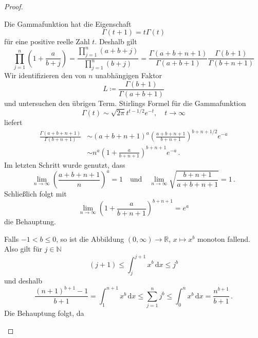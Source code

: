 \documentclass[ngerman,a4paper,11pt]{scrartcl}
\newcommand{\NN}{\mathbb{N}}
\newcommand{\RR}{\mathbb{R}}
\newcommand{\dvar}[1]{\,\mathrm{d}#1}
\begin{document}
\begin{proof}
  \begin{thmlist}
  \item
Die Gammafunktion hat die Eigenschaft 
\begin{equation*}
 \Gamma(t+1)=t\Gamma(t)
\end{equation*}
für eine positive reelle Zahl $t$. Deshalb gilt
\begin{equation*}
  \prod_{j=1}^n\left( 1+\frac{a}{b+j} \right) =\frac{\prod_{j=1}^n(a+b+j)}{\prod_{j=1}^n(b+j)}=
\frac{\Gamma(a+b+n+1)}{\Gamma(a+b+1)}\frac{\Gamma(b+1)}{\Gamma(b+n+1)} 
\end{equation*}
Wir identifizieren den von $n$ unabhängigen Faktor
\begin{equation*}
 L\coloneqq\frac{\Gamma(b+1)}{\Gamma(a+b+1)}
\end{equation*}
und untersuchen den übrigen Term. Stirlings Formel für die Gammafunktion
\begin{equation*}
 \Gamma(t)\sim\sqrt{2\pi} t^{t-1/2}e^{-t},\quad t\to\infty
\end{equation*}
liefert
\begin{align*}
 \frac{\Gamma(a+b+n+1)}{\Gamma(b+n+1)}&\sim (a+b+n+1)^a\left( \frac{a+b+n+1}{b+n+1} \right)^{b+n+1/2}e^{-a} \\
&\sim n^a\left( 1+\frac{a}{b+n+1} \right)^{b+n+1}e^{-a}\,. %
\end{align*}
Im letzten Schritt wurde genutzt, dass
\begin{equation*}
 \lim_{n\to\infty}\left( \frac{a+b+n+1}{n} \right)^a=1\quad\text{und}\quad\lim_{n\to\infty}\sqrt{\frac{b+n+1}{a+b+n+1}}=1\,.
\end{equation*}
Schließlich folgt mit
\begin{equation*}
 \lim_{n\to\infty}\left( 1+\frac{a}{b+n+1} \right)^{b+n+1}=e^a
\end{equation*}
die Behauptung.
\item Falls $-1<b\leq 0$, so ist die Abbildung $(0,\infty)\to\RR$, $x\mapsto
  x^b$ monoton fallend. Also gilt für $j\in\NN$
  \begin{equation*}
   (j+1)\leq\int_j^{j+1}x^b\dvar{x}\leq j^b
  \end{equation*}
  und deshalb
  \begin{equation*}
   \frac{(n+1)^{b+1}-1}{b+1}=\int_1^{n+1}x^b\dvar{x}\leq\sum_{j=1}^nj^b\leq\int_0^nx^b\dvar{x}=\frac{n^{b+1}}{b+1}\,.
  \end{equation*}
Die Behauptung folgt, da
\begin{equation*}

\end{equation*}
\end{thmlist}
\end{proof}
\end{document}
